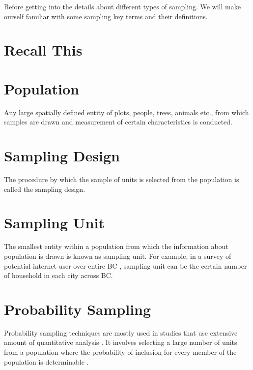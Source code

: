 \documentclass[
]{book}
\begin{document}
Before getting into the details about different types of sampling. We will make ourself familiar with some sampling key terms and their definitions.

\hypertarget{recall-this-1}{%
\section*{Recall This}\label{recall-this-1}}

\hypertarget{population}{%
\section{Population}\label{population}}

Any large spatially defined entity of plots, people, trees, animals etc., from which samples are drawn and measurement of certain characteristics is conducted.

\hypertarget{sampling-design}{%
\section{Sampling Design}\label{sampling-design}}

The procedure by which the sample of units is selected from the population is called the sampling design.

\hypertarget{sampling-unit}{%
\section{Sampling Unit}\label{sampling-unit}}

The smallest entity within a population from which the information about population is drawn is known as sampling unit. For example, in a survey of potential internet user over entire BC , sampling unit can be the certain number of household in each city across BC.

\hypertarget{probability-sampling}{%
\section{Probability Sampling}\label{probability-sampling}}

Probability sampling techniques are mostly used in studies that use extensive amount of quantitative analysis \citep{tashakkori_sage_2010}. It involves selecting a large number of units from a population where the probability of inclusion for every member of the population is determinable \citep{tashakkori_sage_2010}.
\end{document}

